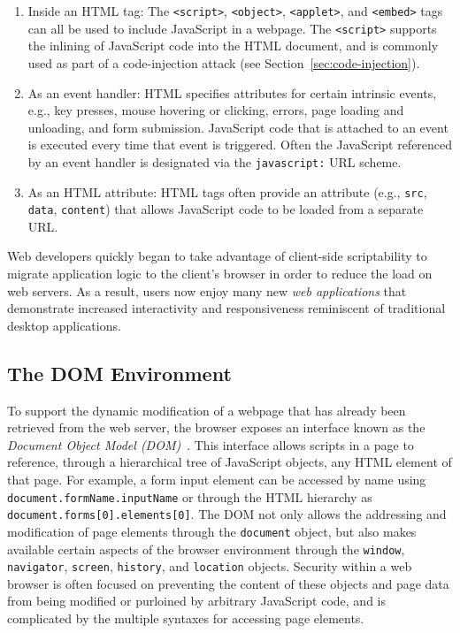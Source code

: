 \documentclass{acmtrans2m}
\begin{document}
\begin{enumerate}
 \item Inside an HTML tag:
The \texttt{<script>}, \texttt{<object>}, \texttt{<applet>}, and \texttt{<embed>} tags can all be used to include JavaScript in a webpage.
The \texttt{<script>} supports the inlining of JavaScript code into the HTML document, and is commonly used as part of a code-injection attack (see Section~\ref{sec:code-injection}).
 \item As an event handler:
HTML specifies attributes for certain intrinsic events, e.g., key presses, mouse hovering or clicking, errors, page loading and unloading, and form submission.
JavaScript code that is attached to an event is executed every time that event is triggered.
Often the JavaScript referenced by an event handler is designated via the \texttt{javascript:} URL scheme.
 \item As an HTML attribute:
HTML tags often provide an attribute (e.g., \texttt{src}, \texttt{data}, \texttt{content}) that allows JavaScript code to be loaded from a separate URL.
\end{enumerate}

Web developers quickly began to take advantage of client-side scriptability to migrate application logic to the client's browser in order to reduce the load on web servers.
As a result, users now enjoy many new \emph{web applications} that demonstrate increased interactivity and responsiveness reminiscent of traditional desktop applications.

\subsection{The DOM Environment}\label{sec:dom}
To support the dynamic modification of a webpage that has already been retrieved from the web server, the browser exposes an interface known as the \emph{Document Object Model (DOM)}~\cite{dom3cor}.
This interface allows scripts in a page to reference, through a hierarchical tree of JavaScript objects, any HTML element of that page.
For example, a form input element can be accessed by name using \texttt{document.formName.inputName} or through the HTML hierarchy as \texttt{document.forms[0].elements[0]}.
The DOM not only allows the addressing and modification of page elements through the \texttt{document} object, but also makes available certain aspects of the browser environment through the \texttt{window}, \texttt{navigator}, \texttt{screen}, \texttt{history}, and \texttt{location} objects.
Security within a web browser is often focused on preventing the content of these objects and page data from being modified or purloined by arbitrary JavaScript code, and is complicated by the multiple syntaxes for accessing page elements.
\end{document}

